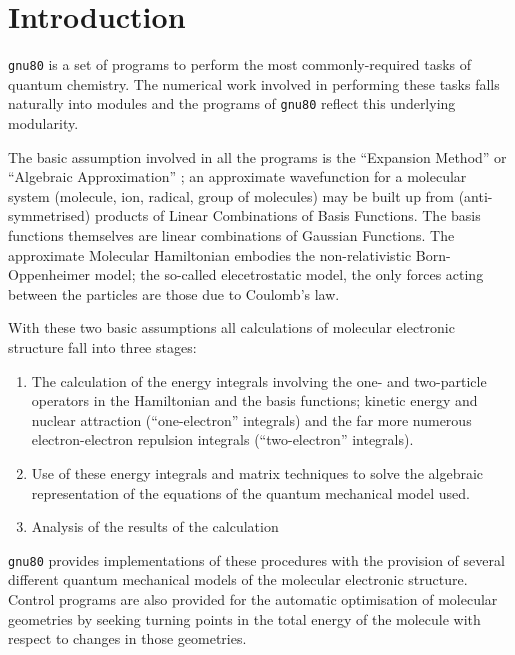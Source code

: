 \chapter{\sf Introduction} 
\label{chap1}
{\tt gnu80} is a set of programs to perform the most commonly-required
tasks of quantum chemistry.
The numerical work involved in performing these tasks falls naturally into
modules and the programs of {\tt gnu80} reflect this 
underlying modularity.

The basic assumption involved in all the programs is the
``Expansion Method'' or ``Algebraic Approximation'' ;
an approximate wavefunction for a molecular system (molecule, ion,
radical, group of molecules) may be built up from
(anti-symmetrised) products of Linear Combinations of Basis Functions.
The basis functions themselves are linear combinations of Gaussian
Functions. 
The approximate Molecular Hamiltonian embodies the non-relativistic
Born-Oppenheimer model; the so-called elecetrostatic model, the
only forces acting between the particles are those due to
Coulomb's law.

With these two basic assumptions all calculations of molecular 
electronic structure fall into three stages:
\begin{enumerate}
\item The calculation of the energy integrals involving the
one- and two-particle operators in the Hamiltonian and the basis
functions; kinetic energy and nuclear attraction (``one-electron'' 
integrals) and the far more numerous electron-electron repulsion
integrals (``two-electron'' integrals).
\item Use of these energy integrals and matrix techniques to 
solve the algebraic representation of the equations of
the quantum mechanical model used.
\item Analysis of the results of the calculation
\end{enumerate}
{\tt gnu80} provides implementations of these procedures with the 
provision of several different quantum mechanical models
of the molecular electronic structure. 
Control programs are also provided for the automatic optimisation of
molecular geometries by seeking turning points in the total energy
of the molecule with respect to changes in those geometries.

